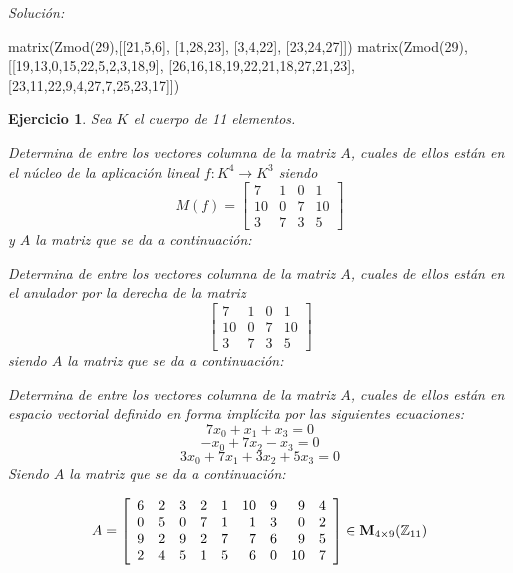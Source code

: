 \documentclass[12pt]{amsart}
\newtheorem{ejer}{Ejercicio}
\begin{document}
{\it Soluci\'on:}

\begin{sageblock}
matrix(Zmod(29),[[21,5,6],
[1,28,23],
[3,4,22],
[23,24,27]])
matrix(Zmod(29),[[19,13,0,15,22,5,2,3,18,9],
[26,16,18,19,22,21,18,27,21,23],
[23,11,22,9,4,27,7,25,23,17]])
\end{sageblock}



\begin{ejer} Sea $K$ el cuerpo de 11 elementos.
\newline
\noindent\begin{minipage}{\textwidth}
\begin{tcolorbox}[colback = green!20!white,title=Versión Núcleo]
Determina de entre los vectores columna de la matriz $A$, cuales de ellos están en el núcleo de la aplicación lineal $f:K^{4} \to K^{3}$ siendo  $$ M(f) = \left[\begin{array}{rrrr}
7 & 1 & 0 & 1 \\
10 & 0 & 7 & 10 \\
3 & 7 & 3 & 5
\end{array}\right] $$ y $A$ la matriz que se da a continuación:\end{tcolorbox}
\end{minipage} \newline
\noindent\begin{minipage}{\textwidth}
\begin{tcolorbox}[colback = blue!20!white,title=Versión Anulador]
Determina de entre los vectores columna de la matriz $A$, cuales de ellos están en el anulador por la derecha de la matriz $$ \left[\begin{array}{rrrr}
7 & 1 & 0 & 1 \\
10 & 0 & 7 & 10 \\
3 & 7 & 3 & 5
\end{array}\right] $$ siendo $A$ la matriz que se da a continuación:\end{tcolorbox}
\end{minipage} \newline
\noindent\begin{minipage}{\textwidth} 
\begin{tcolorbox}[colback = red!20!white,title=Versión Ecuaciones Implícitas]
Determina de entre los vectores columna de la matriz $A$, cuales de ellos están en espacio vectorial definido en forma implícita por las siguientes ecuaciones:
\[ 7 x_{0} + x_{1} + x_{3} = 0 \]
\[ -x_{0} + 7 x_{2} - x_{3} = 0 \]
\[ 3 x_{0} + 7 x_{1} + 3 x_{2} + 5 x_{3} = 0 \]
Siendo $A$ la matriz que se da a continuación:
\end{tcolorbox}
\end{minipage}
\[ A = \left[\begin{array}{rrrrrrrrr}
6 & 2 & 3 & 2 & 1 & 10 & 9 & 9 & 4 \\
0 & 5 & 0 & 7 & 1 & 1 & 3 & 0 & 2 \\
9 & 2 & 9 & 2 & 7 & 7 & 6 & 9 & 5 \\
2 & 4 & 5 & 1 & 5 & 6 & 0 & 10 & 7
\end{array}\right] \in {\bf M}_{4\times 9}({\mathbb Z}_{11})\]
\end{ejer}
\end{document}
